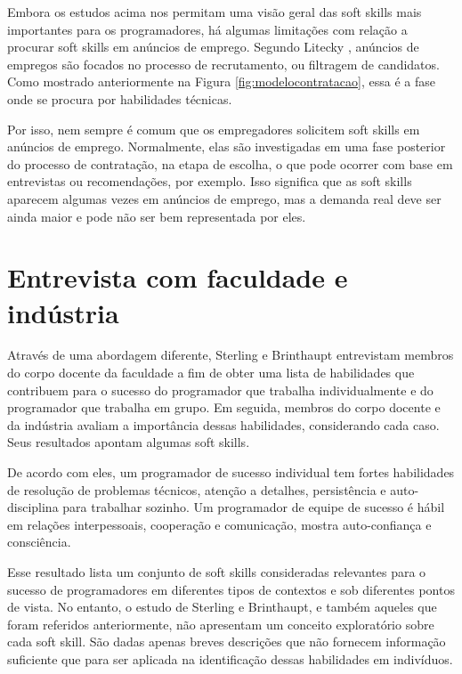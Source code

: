 Embora os estudos acima nos permitam uma visão geral das soft skills mais importantes para os programadores, há algumas limitações com relação a procurar soft skills em anúncios de emprego. Segundo Litecky \cite{litecky:04}, anúncios de empregos são focados no processo de recrutamento, ou filtragem de candidatos. Como mostrado anteriormente na Figura \ref{fig:modelocontratacao}, essa é a fase onde se procura por habilidades técnicas.

Por isso, nem sempre é comum que os empregadores solicitem soft skills em anúncios de emprego.
Normalmente, elas são investigadas em uma fase posterior do processo de contratação, na etapa de escolha, o que pode ocorrer com base em entrevistas ou recomendações, por exemplo. Isso significa que as soft skills aparecem algumas vezes em anúncios de emprego, mas a demanda real deve ser ainda maior e pode não ser bem representada por eles.

\section{Entrevista com faculdade e indústria}
\label{sec:entrevista}

Através de uma abordagem diferente, Sterling e Brinthaupt \cite{sterling:03} entrevistam membros do corpo docente da faculdade a fim de obter uma lista de habilidades que contribuem para o sucesso do programador que trabalha individualmente e do programador que trabalha em grupo. Em seguida, membros do corpo docente e da indústria avaliam a importância dessas habilidades, considerando cada caso. Seus resultados apontam algumas soft skills.

De acordo com eles, um programador de sucesso individual tem fortes habilidades de resolução de problemas técnicos, atenção a detalhes, persistência e auto-disciplina para trabalhar sozinho. Um programador de equipe de sucesso é hábil em relações interpessoais, cooperação e comunicação, mostra auto-confiança e consciência.

Esse resultado lista um conjunto de soft skills consideradas relevantes para o sucesso de programadores em diferentes tipos de contextos e sob diferentes pontos de vista. No entanto, o estudo de Sterling e Brinthaupt, e também aqueles que foram referidos anteriormente, não apresentam um conceito exploratório sobre cada soft skill. São dadas apenas breves descrições que não fornecem informação suficiente que para ser aplicada na identificação dessas habilidades em indivíduos.

